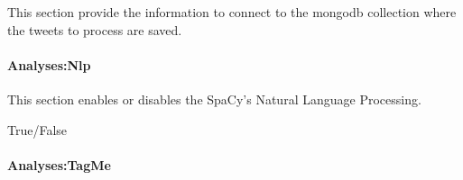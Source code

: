 \documentclass[letterpaper,10pt,english]{sphinxmanual}
\begin{document}
\sphinxAtStartPar
This section provide the information to connect to the mongodb collection where the tweets to process are saved.


\paragraph{Analyses:Nlp}
\label{\detokenize{guide/tweet_processor_guide:analyses-nlp}}
\begin{sphinxVerbatim}[commandchars=\\\{\}]
    
\end{sphinxVerbatim}

\begin{DUlineblock}{0em}
\item[] This section enables or disables the SpaCy’s Natural Language Processing.
\item[]  True/False
\end{DUlineblock}


\paragraph{Analyses:TagMe}
\label{\detokenize{guide/tweet_processor_guide:analyses-tagme}}
\begin{sphinxVerbatim}[commandchars=\\\{\}]
        
        
        
        
\end{sphinxVerbatim}
\end{document}
